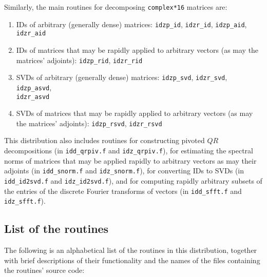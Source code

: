 ﻿\documentclass[letterpaper,12pt]{article}
\begin{document}
Similarly, the main routines for decomposing {\tt complex*16} matrices
are:
%
\begin{enumerate}
%
\item IDs of arbitrary (generally dense) matrices:
{\tt idzp\_id}, {\tt idzr\_id}, {\tt idzp\_aid}, {\tt idzr\_aid}
%
\item IDs of matrices that may be rapidly applied to arbitrary vectors
(as may the matrices' adjoints):
{\tt idzp\_rid}, {\tt idzr\_rid}
%
\item SVDs of arbitrary (generally dense) matrices:
{\tt idzp\_svd}, {\tt idzr\_svd}, {\tt idzp\_asvd},\\{\tt idzr\_asvd}
%
\item SVDs of matrices that may be rapidly applied to arbitrary vectors
(as may the matrices' adjoints):
{\tt idzp\_rsvd}, {\tt idzr\_rsvd}
%
\end{enumerate}

This distribution also includes routines for constructing pivoted $QR$
decompositions (in {\tt idd\_qrpiv.f} and {\tt idz\_qrpiv.f}), for
estimating the spectral norms of matrices that may be applied rapidly
to arbitrary vectors as may their adjoints (in {\tt idd\_snorm.f}
and {\tt idz\_snorm.f}), for converting IDs to SVDs (in
{\tt idd\_id2svd.f} and {\tt idz\_id2svd.f}), and for computing rapidly
arbitrary subsets of the entries of the discrete Fourier transforms
of vectors (in {\tt idd\_sfft.f} and {\tt idz\_sfft.f}).


\subsection{List of the routines}

The following is an alphabetical list of the routines
in this distribution, together with brief descriptions
of their functionality and the names of the files containing
the routines' source code:
\end{document}
